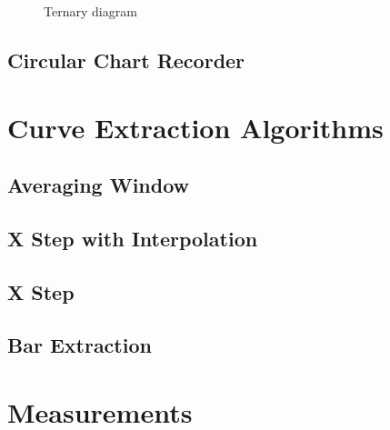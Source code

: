 \documentclass[letterpaper, 11pt]{article}
\begin{document}
\begin{figure}[h!]
\centering
{}
\caption{Ternary diagram}
\end{figure}


\subsection{Circular Chart Recorder}

\section{Curve Extraction Algorithms}

\subsection{Averaging Window}
\subsection{X Step with Interpolation}
\subsection{X Step}
\subsection{Bar Extraction}

\section{Measurements}
\end{document}
